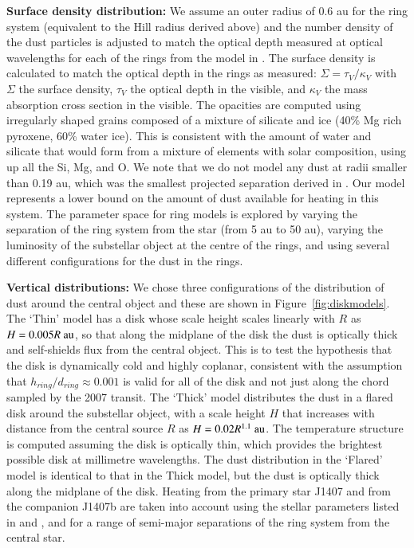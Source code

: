 \documentclass{aa} %
\begin{document}
{\bf Surface density distribution:} We assume an outer radius of 0.6 au for the ring system (equivalent to the Hill radius derived above) and the number density of the dust particles is adjusted to match the optical depth measured at optical wavelengths for each of the rings from the model in \citet{Kenworthy15b}.
%
The surface density is calculated to match the optical depth in the rings as measured: $\Sigma = \tau_V/\kappa_V$ with $\Sigma$ the surface density, $\tau_V$ the optical depth in the visible, and $\kappa_V$ the mass absorption cross section in the visible.
%
The opacities are computed using irregularly shaped grains \citep[applying the method by][]{Min05} composed of a mixture of silicate and ice (40\% Mg rich pyroxene, 60\% water ice).
%
This is consistent with the amount of water and silicate that  would form from a mixture of elements with solar composition, using up all the Si, Mg, and O.
%
We note that we do not model any dust at radii smaller than 0.19 au, which was the smallest projected separation derived in \citet{Kenworthy15b}.
%
Our model represents a lower bound on the amount of dust available for heating in this system.
%
The parameter space for ring models is explored by varying the separation of the ring system from the star (from 5 au to 50 au), varying the luminosity of the substellar object at the centre of the rings, and using several different configurations for the dust in the rings. 

{\bf Vertical distributions:} We chose three configurations of the distribution of dust around the central object and these are shown in Figure~\ref{fig:diskmodels}.
%
The `Thin' model has a disk whose scale height scales linearly with $R$ as $H=0.005 R\rm{~au}$, so that along the midplane of the disk the dust is optically thick and self-shields flux from the central object.
%
This is to test the hypothesis that the disk is dynamically cold and highly coplanar, consistent with the assumption that  $h_{ring}/d_{ring}\approx 0.001$ is valid for all of the disk and not just along the chord sampled by the 2007 transit.
%
The `Thick' model distributes the dust in a flared disk around the substellar object, with a scale height $H$ that increases with distance from the central source $R$ as $H=0.02 R^{1.1}\rm{~au}$.
%
The temperature structure is computed assuming the disk is optically thin, which provides the brightest possible disk at millimetre wavelengths.
%
The dust distribution in the  `Flared' model is identical to that in  the Thick model, but the dust is optically thick along the midplane of the disk.
%
Heating from the primary star J1407 and from the companion J1407b are taken into account using the stellar parameters listed in \citet{vanWerkhoven14} and \citet{Kenworthy15}, and for a range of semi-major separations of the ring system from the central star.
\end{document}
